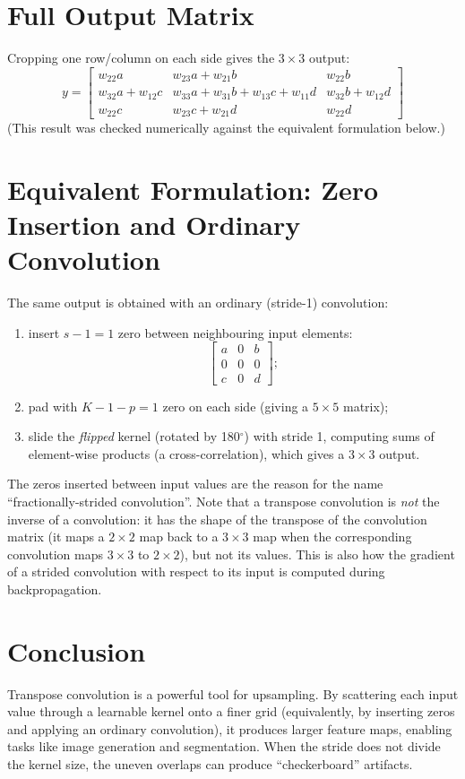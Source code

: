 \begin{notechapter}
\section{Full Output Matrix}
Cropping one row/column on each side gives the \( 3 \times 3 \) output:
\[
y = \begin{bmatrix}
w_{22}a & w_{23}a + w_{21}b & w_{22}b \\
w_{32}a + w_{12}c & w_{33}a + w_{31}b + w_{13}c + w_{11}d & w_{32}b + w_{12}d \\
w_{22}c & w_{23}c + w_{21}d & w_{22}d
\end{bmatrix}
\]
(This result was checked numerically against the equivalent formulation below.)

\section{Equivalent Formulation: Zero Insertion and Ordinary Convolution}
The same output is obtained with an ordinary (stride-1) convolution:
\begin{enumerate}
    \item insert \( s - 1 = 1 \) zero between neighbouring input elements:
    \[
    \begin{bmatrix} a & 0 & b \\ 0 & 0 & 0 \\ c & 0 & d \end{bmatrix};
    \]
    \item pad with \( K - 1 - p = 1 \) zero on each side (giving a \( 5 \times 5 \) matrix);
    \item slide the \emph{flipped} kernel (rotated by 180\(^\circ\)) with stride 1, computing sums of
          element-wise products (a cross-correlation), which gives a \( 3 \times 3 \) output.
\end{enumerate}
The zeros inserted between input values are the reason for the name
``fractionally-strided convolution''. Note that a transpose convolution is \emph{not} the inverse of a
convolution: it has the shape of the transpose of the convolution matrix (it maps a
\( 2 \times 2 \) map back to a \( 3 \times 3 \) map when the corresponding convolution maps \( 3 \times 3 \) to
\( 2 \times 2 \)), but not its values. This is also how the gradient of a strided convolution with respect to its
input is computed during backpropagation.

\section{Conclusion}
Transpose convolution is a powerful tool for upsampling.
By scattering each input value through a learnable kernel onto a finer grid
(equivalently, by inserting zeros and applying an ordinary convolution),
it produces larger feature maps, enabling tasks like
image generation and segmentation. When the stride does not divide the kernel size,
the uneven overlaps can produce ``checkerboard'' artifacts.
\end{notechapter}
